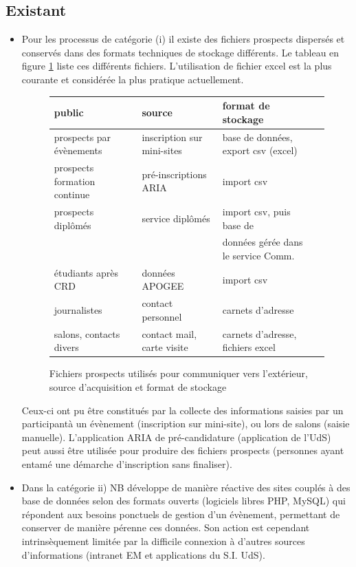 \documentclass{book}
\begin{document}
\subsection{Existant}
\begin{itemize}
\item Pour les processus de catégorie (i) il existe des fichiers prospects 
	dispersés et conservés dans des formats techniques de stockage différents. 
	Le tableau en figure \ref{fg:comm_prospects} liste ces différents fichiers.
	L'utilisation de fichier excel est la plus courante et considérée la plus
	pratique actuellement.

\begin{figure}[hbt]
\begin{center}
	\begin{tabular}{llll}
	\hline
	\hline
	public	& source	 & format de stockage \\
	\hline
	prospects par évènements & inscription sur  mini-sites &  base de données, export csv (excel)\\
	prospects formation continue  & pré-inscriptions ARIA & import csv \\
	prospects diplômés      & service diplômés &  import csv, puis base de \\
					&			 &  données gérée dans le service Comm. \\
	étudiants après CRD 	& données APOGEE & import csv \\
	journalistes 		& contact personnel	& carnets d'adresse \\
	salons, contacts divers	& contact mail, carte visite & carnets d'adresse, fichiers excel\\ 
	\hline
	\hline
	\end{tabular}
\end{center}
\caption{Fichiers prospects utilisés pour communiquer vers l'extérieur, source 
	d'acquisition et format de stockage}
\label{fg:comm_prospects}
\end{figure}
	Ceux-ci  ont pu être constitués par la collecte des informations saisies 
	par un participantà un évènement (inscription sur mini-site), ou lors de 
      salons (saisie manuelle). L'application ARIA de pré-candidature (application de l'UdS)
      peut aussi être utilisée pour produire des fichiers prospects (personnes 
	ayant entamé une démarche d'inscription sans finaliser).

\item Dans la catégorie ii) NB développe de manière réactive des sites couplés à 
	des base de données selon des formats ouverts (logiciels libres PHP, MySQL) 
	qui répondent aux besoins ponctuels de gestion d'un évènement, permettant
	de conserver de manière pérenne ces données. Son action est cependant intrinsèquement
	limitée par la difficile connexion à d'autres sources d'informations (intranet 
	EM et applications du S.I. UdS).


\end{itemize}
\end{document}
